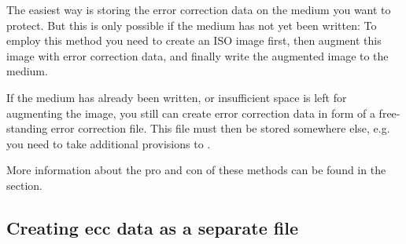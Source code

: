 The easiest way is storing the error correction data on the medium
you want to protect. But this is only possible if the medium has not
yet been written: To employ this method you need to create an ISO image
first, then augment this image with error correction data, and finally
write the augmented image to the medium.

\smallskip

If the medium has already been written, or insufficient space is left
for augmenting the image, you still can create error correction data
in form of a free-standing error correction file. This file must then
be stored somewhere else, e.g. you need to take additional provisions
to .

\smallskip

More information about the pro and con of these methods can be found
in the  section. 

\newpage

\subsection{Creating ecc data as a separate file}
\label{howto-eccfile}

